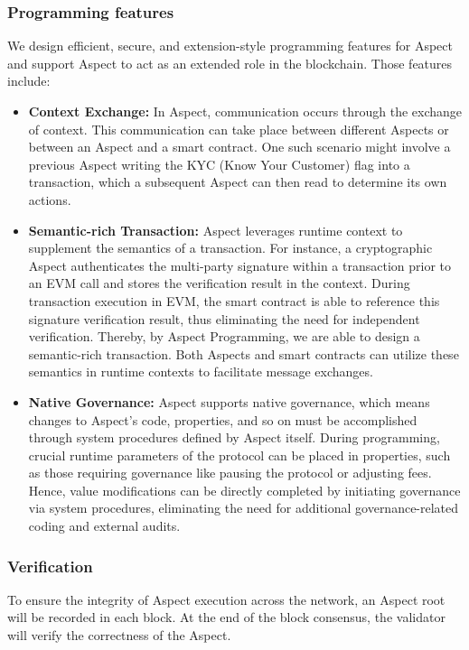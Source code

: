 \subsubsection{Programming features}

We design efficient, secure, and extension-style programming features for Aspect and support Aspect to act as an extended role in the blockchain. Those features include:

\begin{itemize}
  \item \textbf{Context Exchange:} In Aspect, communication occurs through the exchange of context. This communication can take place between different Aspects or between an Aspect and a smart contract. One such scenario might involve a previous Aspect writing the KYC (Know Your Customer) flag into a transaction, which a subsequent Aspect can then read to determine its own actions.
  \item \textbf{Semantic-rich Transaction:} Aspect leverages runtime context to supplement the semantics of a transaction. For instance, a cryptographic Aspect authenticates the multi-party signature within a transaction prior to an EVM call and stores the verification result in the context. During transaction execution in EVM, the smart contract is able to reference this signature verification result, thus eliminating the need for independent verification. Thereby, by Aspect Programming, we are able to design a semantic-rich transaction. Both Aspects and smart contracts can utilize these semantics in runtime contexts to facilitate message exchanges.
  \item \textbf{Native Governance:} Aspect supports native governance, which means changes to Aspect's code, properties, and so on must be accomplished through system procedures defined by Aspect itself. During programming, crucial runtime parameters of the protocol can be placed in properties, such as those requiring governance like pausing the protocol or adjusting fees. Hence, value modifications can be directly completed by initiating governance via system procedures, eliminating the need for additional governance-related coding and external audits.  
\end{itemize}

\subsubsection{Verification}

To ensure the integrity of Aspect execution across the network, an Aspect root will be recorded in each block. At the end of the block consensus, the validator will verify the correctness of the Aspect.

